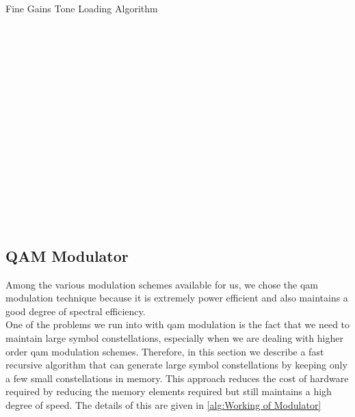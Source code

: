 \begin{algorithm}[!htbp]
\caption{Fine Gains Tone Loading Algorithm}
\label{alg:Fine Gains Algorithm}
\begin{algorithmic}
\\
\\
\\
\\
\\
		\\
		\\
		\\
		\\
		\\
		\\
		\\
		\\
		\\
		\\
	\ENDIF
\ENDWHILE
{} 
\end{algorithmic}
\end{algorithm}

\subsection{QAM Modulator}
Among the various modulation schemes available for us, we chose the \acrshort{qam} modulation technique because it is extremely power efficient and also maintains a good degree of spectral efficiency.\\

One of the problems we run into with \acrshort{qam} modulation is the fact that we need to maintain large symbol constellations, especially when we are dealing with higher order \acrshort{qam} modulation schemes. Therefore, in this section we describe a fast recursive algorithm that can generate large symbol constellations by keeping only a few small constellations in memory. This approach reduces the cost of hardware required by reducing the memory elements required but still maintains a high degree of speed. The details of this are given in \ref{alg:Working of Modulator}

